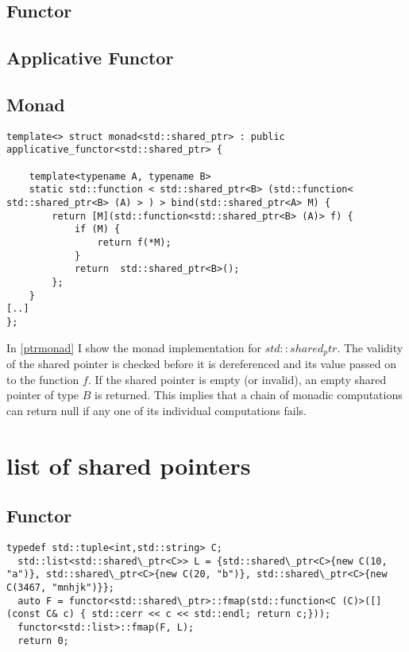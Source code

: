 \documentclass[12pt,fleqn]{article}
\begin{document}
   
%
\subsection{Functor}
   
%
\subsection{Applicative Functor}
 
   
%
\subsection{Monad}
\begin{lstlisting}[caption=monad implemention for std::shared\_ptr, label=ptrmonad]
template<> struct monad<std::shared_ptr> : public applicative_functor<std::shared_ptr> {

	template<typename A, typename B>
	static std::function < std::shared_ptr<B> (std::function< std::shared_ptr<B> (A) > ) > bind(std::shared_ptr<A> M) {
		return [M](std::function<std::shared_ptr<B> (A)> f) {
			if (M) {
				return f(*M);
			}
			return  std::shared_ptr<B>();
		};
	}
[..]
};
\end{lstlisting}

In \ref{ptrmonad} I show the monad implementation for $std::shared_ptr$. 
The validity of the shared pointer is checked before it is dereferenced and its value passed on to the function $f$.
If the shared pointer is empty (or invalid), an empty shared pointer of type $B$ is returned.
This implies that a chain of monadic computations can return null if any one of its individual computations fails.

%
\section{list of shared pointers}
%
%
%

\subsection{Functor}
%
%

\begin{lstlisting}[caption=mapping over a list of shared pointers, label=ptrmap]
  typedef std::tuple<int,std::string> C;
  std::list<std::shared\_ptr<C>> L = {std::shared\_ptr<C>{new C(10, "a")}, std::shared\_ptr<C>{new C(20, "b")}, std::shared\_ptr<C>{new C(3467, "mnhjk")}};
  auto F = functor<std::shared\_ptr>::fmap(std::function<C (C)>([](const C& c) { std::cerr << c << std::endl; return c;}));
  functor<std::list>::fmap(F, L);
  return 0;
\end{lstlisting}
\end{document}
